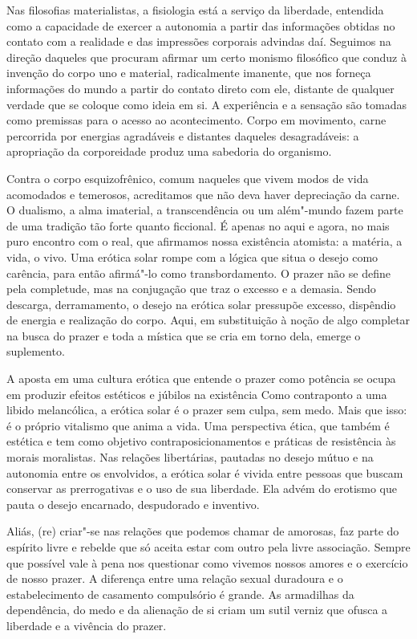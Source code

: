 Nas filosofias materialistas, a fisiologia está a serviço da liberdade,
entendida como a capacidade de exercer a autonomia a partir das
informações obtidas no contato com a realidade e das impressões
corporais advindas daí. Seguimos na direção daqueles que procuram
afirmar um certo monismo filosófico que conduz à invenção do corpo uno e
material, radicalmente imanente, que nos forneça informações do mundo a
partir do contato direto com ele, distante de qualquer verdade que se
coloque como ideia em si. A experiência e a sensação são tomadas como
premissas para o acesso ao acontecimento. Corpo em movimento, carne
percorrida por energias agradáveis e distantes daqueles desagradáveis: a
apropriação da corporeidade produz uma sabedoria do organismo.

Contra o corpo esquizofrênico, comum naqueles que vivem modos de vida
acomodados e temerosos, acreditamos que não deva haver depreciação da
carne. O dualismo, a alma imaterial, a transcendência ou um além"-mundo
fazem parte de uma tradição tão forte quanto ficcional. É apenas no aqui
e agora, no mais puro encontro com o real, que afirmamos nossa
existência atomista: a matéria, a vida, o vivo. Uma erótica solar rompe
com a lógica que situa o desejo como carência, para então afirmá"-lo como
transbordamento. O prazer não se define pela completude, mas na
conjugação que traz o excesso e a demasia. Sendo descarga, derramamento,
o desejo na erótica solar pressupõe excesso, dispêndio de energia e
realização do corpo. Aqui, em substituição à noção de algo completar na
busca do prazer e toda a mística que se cria em torno dela, emerge o
suplemento.

A aposta em uma cultura erótica que entende o prazer como potência se
ocupa em produzir efeitos estéticos e júbilos na existência Como
contraponto a uma libido melancólica, a erótica solar é o prazer sem
culpa, sem medo. Mais que isso: é o próprio vitalismo que anima a vida.
Uma perspectiva ética, que também é estética e tem como objetivo
contraposicionamentos e práticas de resistência às morais moralistas.
Nas relações libertárias, pautadas no desejo mútuo e na autonomia entre
os envolvidos, a erótica solar é vivida entre pessoas que buscam
conservar as prerrogativas e o uso de sua liberdade. Ela advém do
erotismo que pauta o desejo encarnado, despudorado e inventivo.

Aliás, (re) criar"-se nas relações que podemos chamar de amorosas, faz
parte do espírito livre e rebelde que só aceita estar com outro pela
livre associação. Sempre que possível vale à pena nos questionar como
vivemos nossos amores e o exercício de nosso prazer. A diferença entre
uma relação sexual duradoura e o estabelecimento de casamento
compulsório é grande. As armadilhas da dependência, do medo e da
alienação de si criam um sutil verniz que ofusca a liberdade e a
vivência do prazer.

